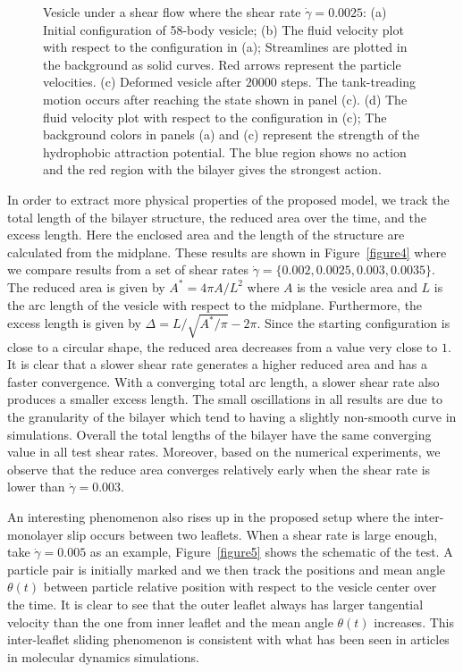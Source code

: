 \documentclass[lineno]{jfm}
\begin{document}
\begin{figure}
  \caption{Vesicle under a shear flow where the shear rate $\dot\gamma=0.0025$: 
  (a) Initial configuration of 58-body vesicle; 
  (b) The fluid velocity plot with respect to the configuration in (a); Streamlines are plotted in the background
  as solid curves. Red arrows represent the particle velocities.
  (c) Deformed vesicle after $20000$ steps. The tank-treading motion occurs after reaching the state shown in panel (c).
  (d) The fluid velocity plot with respect to the configuration in (c);
  The background colors in panels (a) and (c) represent the strength of the hydrophobic attraction potential. The blue region shows no action and the red region with the bilayer gives the strongest action.
  }
    \label{figure3}
\end{figure}
%

In order to extract more physical properties of the proposed model, we track the total length of the bilayer structure, the reduced area over the time, and the excess length. Here the enclosed area and the length of the structure are calculated from the midplane. 
These results are shown in Figure~\ref{figure4} where we compare results from a set of shear rates $\dot\gamma=\{0.002,0.0025,0.003,0.0035\}$. 
The reduced area is given by $A^* = 4\pi A/L^2$ where $A$ is the vesicle area and $L$ is the arc length of the vesicle with respect to the midplane. 
Furthermore, the excess length is given by $\Delta=L/\sqrt{A^*/\pi}-2\pi$.
Since the starting configuration is close to a circular shape, the reduced area decreases from a value very close to $1$. It is clear that a slower shear rate generates a higher reduced area and has a faster convergence. 
With a converging total arc length, a slower shear rate also produces a smaller excess length.
The small oscillations in all results are due to the granularity of the bilayer which tend to having a slightly non-smooth curve in simulations. Overall the total lengths of the bilayer have the same converging value in all test shear rates. Moreover, based on the 
numerical experiments, we observe that the reduce area converges relatively early when the shear rate is lower than $\dot\gamma=0.003$. 

An interesting phenomenon also rises up in the proposed setup where the inter-monolayer slip occurs 
between two leaflets. When a shear rate is large enough, take $\dot\gamma = 0.005$ as an example, 
Figure~\ref{figure5} shows the schematic of the test. A particle pair is initially marked and we then track the positions and mean angle $\theta(t)$ between particle relative position with respect to the vesicle center over the time. It is clear to see that the outer leaflet always has larger 
tangential velocity than the one from inner leaflet and the mean angle $\theta(t)$ increases. 
This inter-leaflet sliding phenomenon is consistent with what has been seen
in articles in molecular dynamics simulations. %
\end{document}
